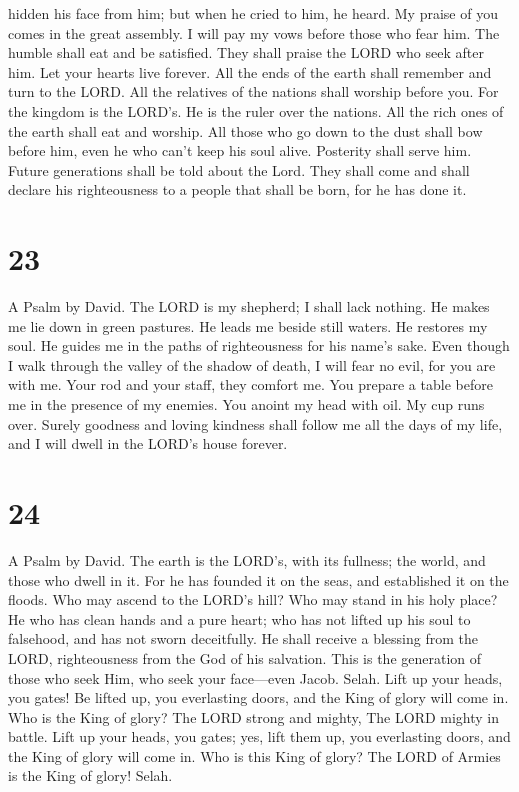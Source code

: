 hidden his face from him; but when he cried to him, he heard.
 My praise of you comes in the great assembly. I will pay
my vows before those who fear him.  The humble shall eat
and be satisfied. They shall praise the LORD who seek after him. Let
your hearts live forever.  All the ends of the earth
shall remember and turn to the LORD. All the relatives of the nations
shall worship before you.  For the kingdom is the LORD's.
He is the ruler over the nations.  All the rich ones of
the earth shall eat and worship. All those who go down to the dust shall
bow before him, even he who can't keep his soul alive. 
Posterity shall serve him. Future generations shall be told about the
Lord.  They shall come and shall declare his
righteousness to a people that shall be born, for he has done it.

\hypertarget{section-22}{%
\section{23}\label{section-22}}

A Psalm by David.  The LORD is my shepherd; I shall lack
nothing.  He makes me lie down in green pastures. He leads
me beside still waters.  He restores my soul. He guides me
in the paths of righteousness for his name's sake.  Even
though I walk through the valley of the shadow of death, I will fear no
evil, for you are with me. Your rod and your staff, they comfort me.
 You prepare a table before me in the presence of my
enemies. You anoint my head with oil. My cup runs over. 
Surely goodness and loving kindness shall follow me all the days of my
life, and I will dwell in the LORD's house forever.

\hypertarget{section-23}{%
\section{24}\label{section-23}}

A Psalm by David.  The earth is the LORD's, with its
fullness; the world, and those who dwell in it.  For he
has founded it on the seas, and established it on the floods.
 Who may ascend to the LORD's hill? Who may stand in his
holy place?  He who has clean hands and a pure heart; who
has not lifted up his soul to falsehood, and has not sworn deceitfully.
 He shall receive a blessing from the LORD, righteousness
from the God of his salvation.  This is the generation of
those who seek Him, who seek your face---even Jacob. Selah.
 Lift up your heads, you gates! Be lifted up, you
everlasting doors, and the King of glory will come in. 
Who is the King of glory? The LORD strong and mighty, The LORD mighty in
battle.  Lift up your heads, you gates; yes, lift them up,
you everlasting doors, and the King of glory will come in.
 Who is this King of glory? The LORD of Armies is the
King of glory! Selah.

